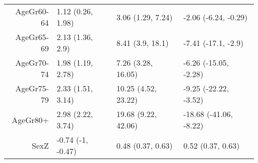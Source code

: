 \begin{table}[ht]
\begin{tabular}{rlll}
  AgeGr60-64 & 1.12 (0.26, 1.98) & 3.06 (1.29, 7.24) & -2.06 (-6.24, -0.29) \\ 
  AgeGr65-69 & 2.13 (1.36, 2.9) & 8.41 (3.9, 18.1) & -7.41 (-17.1, -2.9) \\ 
  AgeGr70-74 & 1.98 (1.19, 2.78) & 7.26 (3.28, 16.05) & -6.26 (-15.05, -2.28) \\ 
  AgeGr75-79 & 2.33 (1.51, 3.14) & 10.25 (4.52, 23.22) & -9.25 (-22.22, -3.52) \\ 
  AgeGr80+ & 2.98 (2.22, 3.74) & 19.68 (9.22, 42.06) & -18.68 (-41.06, -8.22) \\ 
  SexZ & -0.74 (-1, -0.47) & 0.48 (0.37, 0.63) & 0.52 (0.37, 0.63) \\ 
   \hline
\end{tabular}
\end{table}

